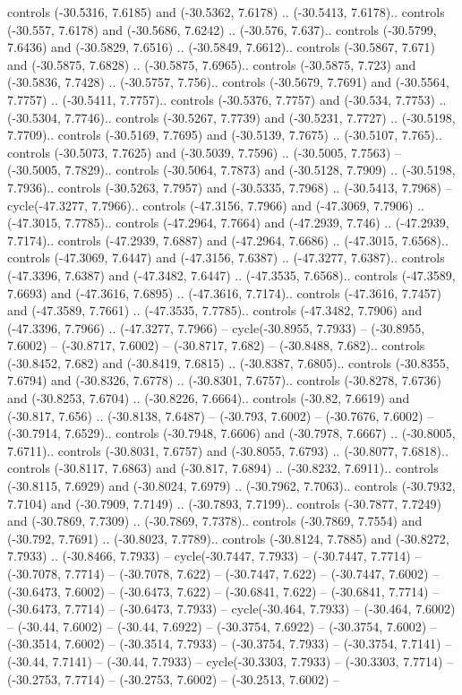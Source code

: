 \begin{scope}[shift={(2.5552, 9.9912)}]
\begin{scope}[shift={(48.1654, -14.8546)}]
controls (-30.5316, 7.6185) and (-30.5362, 7.6178) .. (-30.5413, 7.6178).. controls (-30.557, 7.6178) and (-30.5686, 7.6242) .. (-30.576, 7.637).. controls (-30.5799, 7.6436) and (-30.5829, 7.6516) .. (-30.5849, 7.6612).. controls (-30.5867, 7.671) and (-30.5875, 7.6828) .. (-30.5875, 7.6965).. controls (-30.5875, 7.723) and (-30.5836, 7.7428) .. (-30.5757, 7.756).. controls (-30.5679, 7.7691) and (-30.5564, 7.7757) .. (-30.5411, 7.7757).. controls (-30.5376, 7.7757) and (-30.534, 7.7753) .. (-30.5304, 7.7746).. controls (-30.5267, 7.7739) and (-30.5231, 7.7727) .. (-30.5198, 7.7709).. controls (-30.5169, 7.7695) and (-30.5139, 7.7675) .. (-30.5107, 7.765).. controls (-30.5073, 7.7625) and (-30.5039, 7.7596) .. (-30.5005, 7.7563) -- (-30.5005, 7.7829).. controls (-30.5064, 7.7873) and (-30.5128, 7.7909) .. (-30.5198, 7.7936).. controls (-30.5263, 7.7957) and (-30.5335, 7.7968) .. (-30.5413, 7.7968) -- cycle(-47.3277, 7.7966).. controls (-47.3156, 7.7966) and (-47.3069, 7.7906) .. (-47.3015, 7.7785).. controls (-47.2964, 7.7664) and (-47.2939, 7.746) .. (-47.2939, 7.7174).. controls (-47.2939, 7.6887) and (-47.2964, 7.6686) .. (-47.3015, 7.6568).. controls (-47.3069, 7.6447) and (-47.3156, 7.6387) .. (-47.3277, 7.6387).. controls (-47.3396, 7.6387) and (-47.3482, 7.6447) .. (-47.3535, 7.6568).. controls (-47.3589, 7.6693) and (-47.3616, 7.6895) .. (-47.3616, 7.7174).. controls (-47.3616, 7.7457) and (-47.3589, 7.7661) .. (-47.3535, 7.7785).. controls (-47.3482, 7.7906) and (-47.3396, 7.7966) .. (-47.3277, 7.7966) -- cycle(-30.8955, 7.7933) -- (-30.8955, 7.6002) -- (-30.8717, 7.6002) -- (-30.8717, 7.682) -- (-30.8488, 7.682).. controls (-30.8452, 7.682) and (-30.8419, 7.6815) .. (-30.8387, 7.6805).. controls (-30.8355, 7.6794) and (-30.8326, 7.6778) .. (-30.8301, 7.6757).. controls (-30.8278, 7.6736) and (-30.8253, 7.6704) .. (-30.8226, 7.6664).. controls (-30.82, 7.6619) and (-30.817, 7.656) .. (-30.8138, 7.6487) -- (-30.793, 7.6002) -- (-30.7676, 7.6002) -- (-30.7914, 7.6529).. controls (-30.7948, 7.6606) and (-30.7978, 7.6667) .. (-30.8005, 7.6711).. controls (-30.8031, 7.6757) and (-30.8055, 7.6793) .. (-30.8077, 7.6818).. controls (-30.8117, 7.6863) and (-30.817, 7.6894) .. (-30.8232, 7.6911).. controls (-30.8115, 7.6929) and (-30.8024, 7.6979) .. (-30.7962, 7.7063).. controls (-30.7932, 7.7104) and (-30.7909, 7.7149) .. (-30.7893, 7.7199).. controls (-30.7877, 7.7249) and (-30.7869, 7.7309) .. (-30.7869, 7.7378).. controls (-30.7869, 7.7554) and (-30.792, 7.7691) .. (-30.8023, 7.7789).. controls (-30.8124, 7.7885) and (-30.8272, 7.7933) .. (-30.8466, 7.7933) -- cycle(-30.7447, 7.7933) -- (-30.7447, 7.7714) -- (-30.7078, 7.7714) -- (-30.7078, 7.622) -- (-30.7447, 7.622) -- (-30.7447, 7.6002) -- (-30.6473, 7.6002) -- (-30.6473, 7.622) -- (-30.6841, 7.622) -- (-30.6841, 7.7714) -- (-30.6473, 7.7714) -- (-30.6473, 7.7933) -- cycle(-30.464, 7.7933) -- (-30.464, 7.6002) -- (-30.44, 7.6002) -- (-30.44, 7.6922) -- (-30.3754, 7.6922) -- (-30.3754, 7.6002) -- (-30.3514, 7.6002) -- (-30.3514, 7.7933) -- (-30.3754, 7.7933) -- (-30.3754, 7.7141) -- (-30.44, 7.7141) -- (-30.44, 7.7933) -- cycle(-30.3303, 7.7933) -- (-30.3303, 7.7714) -- (-30.2753, 7.7714) -- (-30.2753, 7.6002) -- (-30.2513, 7.6002) -- 
\end{scope}
\end{scope}
